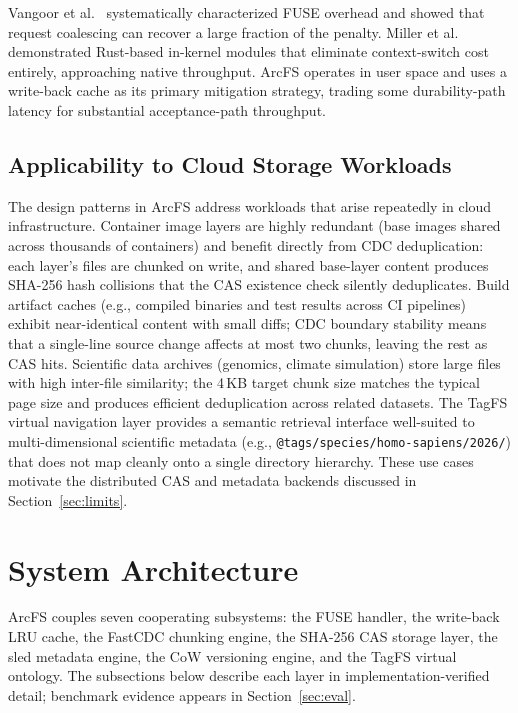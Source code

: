 \documentclass[5p,times]{elsarticle}
\begin{document}
Vangoor et al.~\cite{vangoor2017fuse} systematically characterized FUSE
overhead and showed that request coalescing can recover a large fraction of
the penalty. Miller et al.~\cite{miller2021bento} demonstrated Rust-based
in-kernel modules that eliminate context-switch cost entirely, approaching
native throughput. ArcFS operates in user space and uses a write-back
cache as its primary mitigation strategy, trading some durability-path
latency for substantial acceptance-path throughput.

\subsection{Applicability to Cloud Storage Workloads}

The design patterns in ArcFS address workloads that arise repeatedly in
cloud infrastructure.  Container image layers are highly redundant
(base images shared across thousands of containers) and benefit directly
from CDC deduplication: each layer's files are chunked on write, and
shared base-layer content produces SHA-256 hash collisions that the CAS
existence check silently deduplicates.  Build artifact caches (e.g.,
compiled binaries and test results across CI pipelines) exhibit near-identical
content with small diffs; CDC boundary stability means that a single-line
source change affects at most two chunks, leaving the rest as CAS
hits.  Scientific data archives (genomics, climate simulation) store
large files with high inter-file similarity; the 4\,KB target chunk size
matches the typical page size and produces efficient deduplication across
related datasets.  The TagFS virtual navigation layer provides a semantic
retrieval interface well-suited to multi-dimensional scientific metadata
(e.g., \texttt{@tags/species/homo-sapiens/2026/}) that does not map
cleanly onto a single directory hierarchy.  These use cases motivate the
distributed CAS and metadata backends discussed in Section~\ref{sec:limits}.

\section{System Architecture}
\label{sec:arch}

ArcFS couples seven cooperating subsystems: the FUSE handler, the
write-back LRU cache, the FastCDC chunking engine, the SHA-256 CAS
storage layer, the sled metadata engine, the CoW versioning engine,
and the TagFS virtual ontology. The subsections below describe each
layer in implementation-verified detail; benchmark evidence appears
in Section~\ref{sec:eval}.
\end{document}
